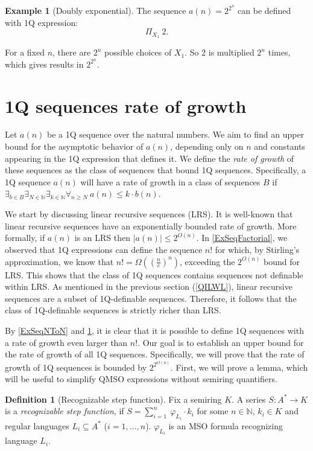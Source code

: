 \documentclass[12pt]{article}
\newcommand{\filip}[1]{\todo[color=green!10]{{\bf Filip:} #1}}
\theoremstyle{definition}
\newtheorem{definition}{Definition}[section]
\newtheorem{example}{Example}[section]
\begin{document}
\begin{example}[Doubly exponential]
\label{ExSeqDoubleExponential}
    The sequence $a(n) = 2^{2^n}$ can be defined with 1Q expression:
    $$\Pi_{X_1} \ 2.$$

    For a fixed $n$, there are $2^n$ possible choices of $X_1$. So $2$ is multiplied $2^n$ times, which gives results in $2^{2^n}$.
\end{example}

\section{1Q sequences rate of growth}
\label{Sec1QRateOfGrowth}
Let $a(n)$ be a 1Q sequence over the natural numbers. We aim to find an upper bound for the asymptotic behavior of $a(n)$, depending only on $n$ and constants appearing in the 1Q expression that defines it. We define the \emph{rate of growth} of these sequences as the class of sequences that bound 1Q sequences. Specifically, a 1Q sequence $a(n)$ will have a rate of growth in a class of sequences $B$ if $\exists_{b \in B} \exists_{N \in \mathbb{N}} \exists_{k \in \mathbb{N}} \forall_{n \geq N} \ a(n) \leq k \cdot b(n)$.

We start by discussing linear recursive sequences (LRS). It is well-known that linear recursive sequences have an exponentially bounded rate of growth. More formally, if $a(n)$ is an LRS then $|a(n)| \le 2^{O(n)}$. In \cref{ExSeqFactorial}, we observed that 1Q expressions can define the sequence $n!$ for which, by Stirling's approximation, we know that $n! = \Omega((\frac{n}{e})^n)$, exceeding the $2^{O(n)}$ bound for LRS. This shows that the class of 1Q sequences contains sequences not definable within LRS. As mentioned in the previous section (\ref{QILWL}), linear recursive sequences are a subset of 1Q-definable sequences. Therefore, it follows that the class of 1Q-definable sequences is strictly richer than LRS.

By \cref{ExSeqNToN} and \cref{ExSeqDoubleExponential}, it is clear that it is possible to define 1Q sequences with a rate of growth even larger than $n!$. Our goal is to establish an upper bound for the rate of growth of all 1Q sequences. Specifically, we will prove that the rate of growth of 1Q sequences is bounded by $2^{2^{O(n)}}$. First, we will prove a lemma, which will be useful to simplify QMSO expressions without semiring quantifiers.

\begin{definition}[Recognizable step function]
    \label{DefRecStepFun}
    Fix a semiring $K$.
    A series $S: A^* \rightarrow K$ is a \textit{recognizable step function}, if $S = \sum_{i = 1}^{n} \ \varphi_{L_i} \cdot k_i$\filip{suma w sensie polpierscienia? (alek) tak} for some $n \in \mathbb{N}$, $k_i \in K$ and regular languages $L_i \subseteq A^*$ ($i=1,\ldots,n$). $\varphi_{L_i}$ is an MSO formula recognizing language $L_i$.
\end{definition}
\end{document}
